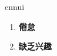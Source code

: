 
\begin{frame}
{\huge ennui}
\begin{center}
\begin{enumerate}\Large
  \item \textbf{倦怠}
  \item \textbf{缺乏兴趣}
\end{enumerate}
\end{center}
\end{frame}
